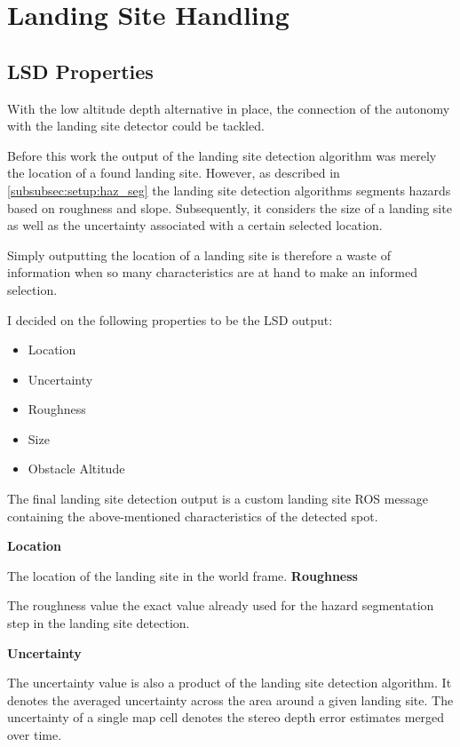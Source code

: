 \section{Landing Site Handling}\label{subsubsec:LandingSiteHeuristic}

\subsection{LSD Properties}\label{sec:LSproperties}

With the low altitude depth alternative in place, the connection of the autonomy with the landing site detector could be tackled. 

Before this work the output of the landing site detection algorithm was merely the location of a found landing site. However, as described in \cref{subsubsec:setup:haz_seg} the landing site detection algorithms segments hazards based on roughness and slope. Subsequently, it considers the size of a landing site as well as the uncertainty associated with a certain selected location. 

Simply outputting the location of a landing site is therefore a waste of information when so many characteristics are at hand to make an informed selection. 

I decided on the following properties to be the LSD output:

\begin{itemize}
    \item Location
    \item Uncertainty
    \item Roughness
    \item Size
    \item Obstacle Altitude
\end{itemize}
The final landing site detection output is a custom landing site ROS message containing the above-mentioned characteristics of the detected spot.

\textbf{Location}

The location of the landing site in the world frame.
\textbf{Roughness}

The roughness value the exact value already used for the hazard segmentation step in the landing site detection. 

\textbf{Uncertainty}

The uncertainty value is also a product of the landing site detection algorithm. It denotes the averaged uncertainty across the area around a given landing site. The uncertainty of a single map cell denotes the stereo depth error estimates merged over time.

